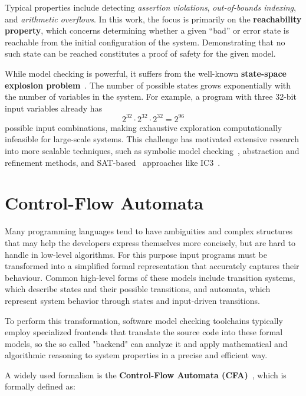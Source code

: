 Typical properties include detecting \textit{assertion violations}, \textit{out-of-bounds indexing}, and \textit{arithmetic overflows}. In this work, the focus is primarily on the \textbf{reachability property}, which concerns determining whether a given “bad” or error state is reachable from the initial configuration of the system. Demonstrating that no such state can be reached constitutes a proof of safety for the given model.

While model checking is powerful, it suffers from the well-known \textbf{state-space explosion problem}~\cite{statespaceexplosionproblem}. The number of possible states grows exponentially with the number of variables in the system. For example, a program with three 32-bit input variables already has
\[
2^{32} \cdot 2^{32} \cdot 2^{32} = 2^{96}
\]
possible input combinations, making exhaustive exploration computationally infeasible for large-scale systems. This challenge has motivated extensive research into more scalable techniques, such as symbolic model checking~\cite{symbolicMC}, abstraction and refinement methods\cite{boundedMC}, and SAT-based~\cite{SMT-LIB} approaches like IC3~\cite{ic3}.

\section{Control-Flow Automata}\label{sec:cfa}

Many programming languages tend to have ambiguities and complex structures that may help the developers express themselves more concisely, but are hard to handle in low-level algorithms. For this purpose input programs must be transformed into a simplified formal representation that accurately captures their behaviour. Common high-level forms of these models include transition systems, which describe states and their possible transitions, and automata, which represent system behavior through states and input-driven transitions.

To perform this transformation, software model checking toolchains typically employ specialized frontends that translate the source code into these formal models, so the so called "backend" can analyze it and apply mathematical and algorithmic reasoning to system properties in a precise and efficient way.

A widely used formalism is the \textbf{Control-Flow Automata (CFA)}~\cite{cfa}, which is formally defined as:

